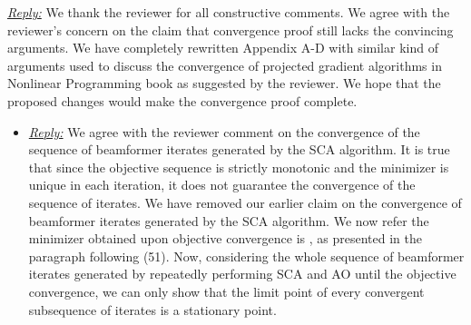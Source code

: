 
\vspace{1eM}
\underline{\textit{Reply:}} We thank the reviewer for all constructive comments. We agree with the reviewer's concern on the claim that convergence proof still lacks the convincing arguments. We have completely rewritten Appendix A-D with similar kind of arguments used to discuss the convergence of projected gradient algorithms in Nonlinear Programming book as suggested by the reviewer. We hope that the proposed changes would make the convergence proof complete.

\begin{itemize}
	
	\item {}

	\vspace{1eM}	
	\underline{\textit{Reply:}} We agree with the reviewer comment on the convergence of the sequence of beamformer iterates generated by the SCA algorithm. It is true that since the objective sequence is strictly monotonic and the minimizer is unique in each iteration, it does not guarantee the convergence of the sequence of iterates. We have removed our earlier claim on the convergence of beamformer iterates generated by the SCA algorithm. We now refer the minimizer obtained upon objective convergence is , as presented in the paragraph following (51). Now, considering the whole sequence of beamformer iterates generated by repeatedly performing SCA and AO until the objective convergence, we can only show that the limit point of every convergent subsequence of iterates is a stationary point.	
	

\end{itemize}
